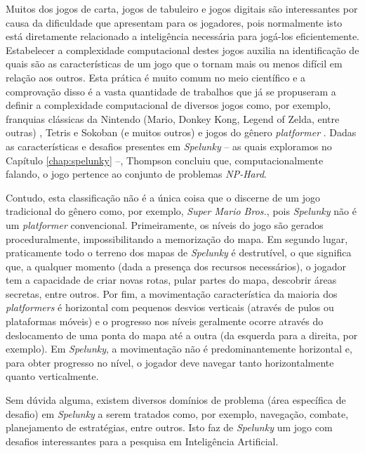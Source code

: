 Muitos dos jogos de carta, jogos de tabuleiro e jogos digitais são interessantes
por causa da dificuldade que apresentam para os jogadores, pois normalmente isto
está diretamente relacionado a inteligência necessária para jogá-los
eficientemente.  Estabelecer a complexidade computacional destes jogos auxilia
na identificação de quais são as características de um jogo que o tornam mais ou
menos difícil em relação aos outros. Esta prática é muito comum no meio
científico e a comprovação disso é a vasta quantidade de trabalhos que já se
propuseram a definir a complexidade computacional de diversos jogos como, por
exemplo, franquias clássicas da Nintendo (Mario, Donkey Kong, Legend of Zelda,
entre outras) \cite{classic_nintendo_games_hard}, Tetris e Sokoban (e muitos
outros) \cite{playing_games_algorithms} e jogos do gênero \textit{platformer}
\cite{computational_complexity_platformers}. Dadas as características e desafios
presentes em \textit{Spelunky} -- as quais exploramos no Capítulo
\ref{chap:spelunky} --, Thompson \cite{SPELUNKYHARD} concluiu que,
computacionalmente falando, o jogo pertence ao conjunto de problemas
\textit{NP-Hard}.

Contudo, esta classificação não é a única coisa que o discerne de um jogo
tradicional do gênero como, por exemplo, \textit{Super Mario Bros.}, pois
\textit{Spelunky} não é um \textit{platformer} convencional. Primeiramente, os
níveis do jogo são gerados proceduralmente, impossibilitando a memorização do
mapa. Em segundo lugar, praticamente todo o terreno dos mapas de
\textit{Spelunky} é destrutível, o que significa que, a qualquer momento (dada a
presença dos recursos necessários), o jogador tem a capacidade de criar novas
rotas, pular partes do mapa, descobrir áreas secretas, entre outros. Por fim, a
movimentação característica da maioria dos \textit{platformers} é horizontal com
pequenos desvios verticais (através de pulos ou plataformas móveis) e o
progresso nos níveis geralmente ocorre através do deslocamento de uma ponta do
mapa até a outra (da esquerda para a direita, por exemplo). Em
\textit{Spelunky}, a movimentação não é predominantemente horizontal e, para
obter progresso no nível, o jogador deve navegar tanto horizontalmente quanto
verticalmente.

Sem dúvida alguma, existem diversos domínios de problema (área específica de
desafio) em \textit{Spelunky} a serem tratados como, por exemplo, navegação,
combate, planejamento de estratégias, entre outros. Isto faz de
\textit{Spelunky} um jogo com desafios interessantes para a pesquisa em
Inteligência Artificial.

